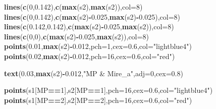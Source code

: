 \documentclass[]{article}
\newenvironment{Shaded}{\begin{snugshade}}{\end{snugshade}}
\newcommand{\DataTypeTok}[1]{\textcolor[rgb]{0.13,0.29,0.53}{#1}}
\newcommand{\DecValTok}[1]{\textcolor[rgb]{0.00,0.00,0.81}{#1}}
\newcommand{\FloatTok}[1]{\textcolor[rgb]{0.00,0.00,0.81}{#1}}
\newcommand{\KeywordTok}[1]{\textcolor[rgb]{0.13,0.29,0.53}{\textbf{#1}}}
\newcommand{\NormalTok}[1]{#1}
\newcommand{\OperatorTok}[1]{\textcolor[rgb]{0.81,0.36,0.00}{\textbf{#1}}}
\newcommand{\StringTok}[1]{\textcolor[rgb]{0.31,0.60,0.02}{#1}}
\begin{document}
\begin{Shaded}
\begin{Highlighting}[]
\KeywordTok{lines}\NormalTok{(}\KeywordTok{c}\NormalTok{(}\DecValTok{0}\NormalTok{,}\FloatTok{0.142}\NormalTok{),}\KeywordTok{c}\NormalTok{(}\KeywordTok{max}\NormalTok{(s2),}\KeywordTok{max}\NormalTok{(s2)),}\DataTypeTok{col=}\DecValTok{8}\NormalTok{)}
\KeywordTok{lines}\NormalTok{(}\KeywordTok{c}\NormalTok{(}\DecValTok{0}\NormalTok{,}\FloatTok{0.142}\NormalTok{),}\KeywordTok{c}\NormalTok{(}\KeywordTok{max}\NormalTok{(s2)}\OperatorTok{-}\FloatTok{0.025}\NormalTok{,}\KeywordTok{max}\NormalTok{(s2)}\OperatorTok{-}\FloatTok{0.025}\NormalTok{),}\DataTypeTok{col=}\DecValTok{8}\NormalTok{)}
\KeywordTok{lines}\NormalTok{(}\KeywordTok{c}\NormalTok{(}\FloatTok{0.142}\NormalTok{,}\FloatTok{0.142}\NormalTok{),}\KeywordTok{c}\NormalTok{(}\KeywordTok{max}\NormalTok{(s2)}\OperatorTok{-}\FloatTok{0.025}\NormalTok{,}\KeywordTok{max}\NormalTok{(s2)),}\DataTypeTok{col=}\DecValTok{8}\NormalTok{)}
\KeywordTok{lines}\NormalTok{(}\KeywordTok{c}\NormalTok{(}\DecValTok{0}\NormalTok{,}\DecValTok{0}\NormalTok{),}\KeywordTok{c}\NormalTok{(}\KeywordTok{max}\NormalTok{(s2)}\OperatorTok{-}\FloatTok{0.025}\NormalTok{,}\KeywordTok{max}\NormalTok{(s2)),}\DataTypeTok{col=}\DecValTok{8}\NormalTok{)}
\KeywordTok{points}\NormalTok{(}\FloatTok{0.01}\NormalTok{,}\KeywordTok{max}\NormalTok{(s2)}\OperatorTok{-}\FloatTok{0.012}\NormalTok{,}\DataTypeTok{pch=}\DecValTok{1}\NormalTok{,}\DataTypeTok{cex=}\FloatTok{0.6}\NormalTok{,}\DataTypeTok{col=}\StringTok{"lightblue4"}\NormalTok{)}
\KeywordTok{points}\NormalTok{(}\FloatTok{0.02}\NormalTok{,}\KeywordTok{max}\NormalTok{(s2)}\OperatorTok{-}\FloatTok{0.012}\NormalTok{,}\DataTypeTok{pch=}\DecValTok{16}\NormalTok{,}\DataTypeTok{cex=}\FloatTok{0.6}\NormalTok{,}\DataTypeTok{col=}\StringTok{"red"}\NormalTok{)}

\KeywordTok{text}\NormalTok{(}\FloatTok{0.03}\NormalTok{,}\KeywordTok{max}\NormalTok{(s2)}\OperatorTok{-}\FloatTok{0.012}\NormalTok{,}\StringTok{"MP & Mire_a"}\NormalTok{,}\DataTypeTok{adj=}\DecValTok{0}\NormalTok{,}\DataTypeTok{cex=}\FloatTok{0.8}\NormalTok{)}

\KeywordTok{points}\NormalTok{(s1[MP}\OperatorTok{==}\DecValTok{1}\NormalTok{],s2[MP}\OperatorTok{==}\DecValTok{1}\NormalTok{],}\DataTypeTok{pch=}\DecValTok{16}\NormalTok{,}\DataTypeTok{cex=}\FloatTok{0.6}\NormalTok{,}\DataTypeTok{col=}\StringTok{"lightblue4"}\NormalTok{)}
\KeywordTok{points}\NormalTok{(s1[MP}\OperatorTok{==}\DecValTok{2}\NormalTok{],s2[MP}\OperatorTok{==}\DecValTok{2}\NormalTok{],}\DataTypeTok{pch=}\DecValTok{16}\NormalTok{,}\DataTypeTok{cex=}\FloatTok{0.6}\NormalTok{,}\DataTypeTok{col=}\StringTok{"red"}\NormalTok{)}


\end{Highlighting}
\end{Shaded}
\end{document}
